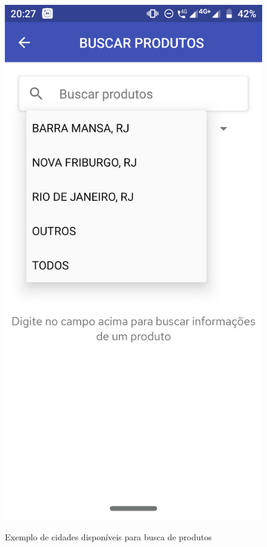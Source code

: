 \begin{figure}[h]
    \centering
    \caption{Exemplo de cidades disponíveis para busca de produtos}
    \includegraphics[scale=0.15]{tcc/figures/app/app_buscar_produtos_cidades.png}
    \label{appBuscaProdutosCidadesFig}
\end{figure}

